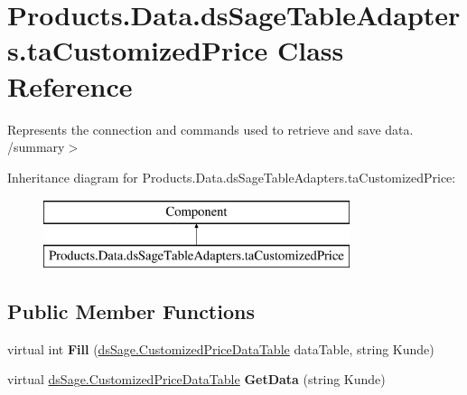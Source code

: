 \hypertarget{class_products_1_1_data_1_1ds_sage_table_adapters_1_1ta_customized_price}{}\section{Products.\+Data.\+ds\+Sage\+Table\+Adapters.\+ta\+Customized\+Price Class Reference}
\label{class_products_1_1_data_1_1ds_sage_table_adapters_1_1ta_customized_price}


Represents the connection and commands used to retrieve and save data. /summary$>$  


Inheritance diagram for Products.\+Data.\+ds\+Sage\+Table\+Adapters.\+ta\+Customized\+Price\+:\begin{figure}[H]
\begin{center}
\leavevmode
\includegraphics[height=2.000000cm]{class_products_1_1_data_1_1ds_sage_table_adapters_1_1ta_customized_price}
\end{center}
\end{figure}
\subsection*{Public Member Functions}
\begin{DoxyCompactItemize}
\item 
virtual int {\bfseries Fill} (\hyperlink{class_products_1_1_data_1_1ds_sage_1_1_customized_price_data_table}{ds\+Sage.\+Customized\+Price\+Data\+Table} data\+Table, string Kunde)\hypertarget{class_products_1_1_data_1_1ds_sage_table_adapters_1_1ta_customized_price_a4413555aebca19995243540230144315}{}\label{class_products_1_1_data_1_1ds_sage_table_adapters_1_1ta_customized_price_a4413555aebca19995243540230144315}

\item 
virtual \hyperlink{class_products_1_1_data_1_1ds_sage_1_1_customized_price_data_table}{ds\+Sage.\+Customized\+Price\+Data\+Table} {\bfseries Get\+Data} (string Kunde)\hypertarget{class_products_1_1_data_1_1ds_sage_table_adapters_1_1ta_customized_price_af97f9e57ca3e0b96b6de6fb7d5c568b5}{}\label{class_products_1_1_data_1_1ds_sage_table_adapters_1_1ta_customized_price_af97f9e57ca3e0b96b6de6fb7d5c568b5}

\end{DoxyCompactItemize}
